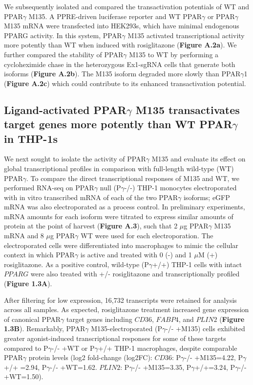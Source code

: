 We subsequently isolated and compared the transactivation potentials of WT and PPAR$\gamma$ M135. A PPRE-driven luciferase reporter\cite{Kim1998-aj} and WT PPAR$\gamma$ or PPAR$\gamma$ M135 mRNA were transfected into HEK293s, which have minimal endogenous PPARG activity\cite{Ma2012-dm}. In this system, PPAR$\gamma$ M135 activated transcriptional activity more potently than WT when induced with rosiglitazone (\textbf{Figure A.2a}). We further compared the stability of PPAR$\gamma$ M135 to WT by performing a cycloheximide chase\cite{Hsu1996-yv} in the heterozygous Ex1-sgRNA cells that generate both isoforms (\textbf{Figure A.2b}). The M135 isoform degraded more slowly than PPAR$\gamma$1 (\textbf{Figure A.2c}) which could contribute to its enhanced transactivation potential.

\subsection{Ligand-activated PPAR\texorpdfstring{$\gamma$}{gamma} M135 transactivates target genes more potently than WT PPAR\texorpdfstring{$\gamma$}{gamma} in THP-1s}

We next sought to isolate the activity of PPAR$\gamma$ M135 and evaluate its effect on global transcriptional profiles in comparison with full-length wild-type (WT) PPAR$\gamma$. To compare the direct transcriptional responses of M135 and WT, we performed RNA-seq on PPAR$\gamma$ null (P$\gamma$-/-) THP-1 monocytes electroporated with in vitro transcribed mRNA of each of the two PPAR$\gamma$ isoforms; eGFP mRNA was also electroporated as a process control. In preliminary experiments, mRNA amounts for each isoform were titrated to express similar amounts of protein at the point of harvest (\textbf{Figure A.3}), such that 2 $\mu$g PPAR$\gamma$ M135 mRNA and 8 $\mu$g PPAR$\gamma$ WT were used for each electroporation. The electroporated cells were differentiated into macrophages to mimic the cellular context in which PPAR$\gamma$ is active\cite{Rovera1979-za} and treated with 0 (-) and 1 $\mu$M (+) rosiglitazone. As a positive control, wild-type (P$\gamma$+/+) THP-1 cells with intact \(PPARG\) were also treated with +/- rosiglitazone and transcriptionally profiled (\textbf{Figure 1.3A}).

After filtering for low expression, 16,732 transcripts were retained for analysis across all samples. As expected, rosiglitazone treatment increased gene expression of canonical PPAR$\gamma$ target genes including \(CD36\), \(FABP4\)\cite{Tontonoz1994-nk}, and \(PLIN2\)\cite{Hodgkinson2003-fo} (\textbf{Figure 1.3B}). Remarkably, PPAR$\gamma$ M135-electroporated (P$\gamma$-/- +M135) cells exhibited greater agonist-induced transcriptional responses for some of these targets compared to P$\gamma$-/- +WT or P$\gamma$+/+ THP-1 macrophages, despite comparable PPAR$\gamma$ protein levels (log2 fold-change (log2FC): \(CD36\): P$\gamma$-/- +M135=4.22, P$\gamma$+/+ =2.94, P$\gamma$-/- +WT=1.62. \(PLIN2\): P$\gamma$-/- +M135=3.35, P$\gamma$+/+=3.24, P$\gamma$-/- +WT=1.50).

